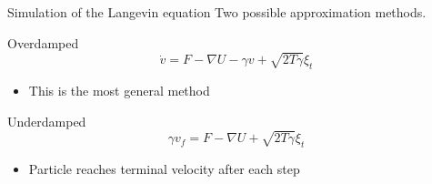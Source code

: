 \begin{frame}{Simulation of the Langevin equation}
Two possible approximation methods.
  		\begin{block}{Overdamped}
  	  		\begin{equation*}
  	  		\dot{v} = F - \nabla U - \gamma v + \sqrt{2T\gamma}\xi_t
  	  		\end{equation*}
  	  	\end{block}
  	  	\begin{itemize}
  	  	 \item This is the most general method
  	  	\end{itemize}
  	  	\begin{block}{ Underdamped}
  	  		  			\begin{equation*}\label{eqn:overdamped}
  	  		  			\gamma v_f = F - \nabla U + \sqrt{2T\gamma}\xi_t
  	  		  			\end{equation*}
  	  		  			\begin{itemize}
  	  		  			\item Particle reaches terminal velocity after each step
  	  		  			\end{itemize}
  	  	\end{block}
\end{frame}


